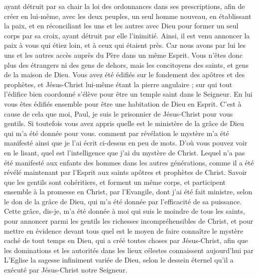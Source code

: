\begin{multicols}{2}
ayant détruit par sa chair la loi des ordonnances dans ses prescriptions, afin de créer en lui-même, avec les deux peuples, un seul homme nouveau, en établissant la paix,
et en réconciliant les uns et les autres avec Dieu pour former un seul corps par sa croix, ayant détruit par elle l'inimitié.
Ainsi, il est venu annoncer la paix à vous qui étiez loin, et à ceux qui étaient près.
Car nous avons par lui les uns et les autres accès auprès du Père dans un même Esprit.
Vous n'êtes donc plus des étrangers ni des gens de dehors, mais les concitoyens des saints, et gens de la maison de Dieu.
Vous avez été édifiés sur le fondement des apôtres et des prophètes, et Jésus-Christ lui-même étant la pierre angulaire ;
sur qui tout l'édifice bien coordonné s'élève pour être un temple saint dans le Seigneur.
En lui vous êtes édifiés ensemble pour être une habitation de Dieu en Esprit.
\VerseOne{}C’est à cause de cela que moi, Paul, je suis le prisonnier de Jésus-Christ pour vous gentils.
Si toutefois vous avez appris quelle est le ministère de la grâce de Dieu qui m'a été donnée pour vous.
comment par révélation le mystère m'a été manifesté ainsi que je l'ai écrit ci-dessus en peu de mots.
D'où vous pouvez voir en le lisant, quel est l'intelligence que j'ai du mystère de Christ.
Lequel n'a pas été manifesté aux enfants des hommes dans les autres générations, comme il a été révélé maintenant par l'Esprit aux saints apôtres et prophètes de Christ.
Savoir que les gentils sont cohéritiers, et forment un même corps, et participent ensemble à la promesse en Christ, par l'Evangile,
dont j'ai été fait ministre, selon le don de la grâce de Dieu, qui m'a été donnée par l’efficacité de sa puissance.
Cette grâce, dis-je, m'a été donnée à moi qui suis le moindre de tous les saints, pour annoncer parmi les gentils les richesses incompréhensibles de Christ,
et pour mettre en évidence devant tous quel est le moyen de faire connaître le mystère caché de tout temps en Dieu, qui a créé toutes choses par Jésus-Christ,
afin que les dominations et les autorités dans les lieux célestes connaissent aujourd’hui par L’Eglise la sagesse infiniment variée de Dieu,
selon le dessein éternel qu’il a exécuté par Jésus-Christ notre Seigneur.

\end{multicols}
